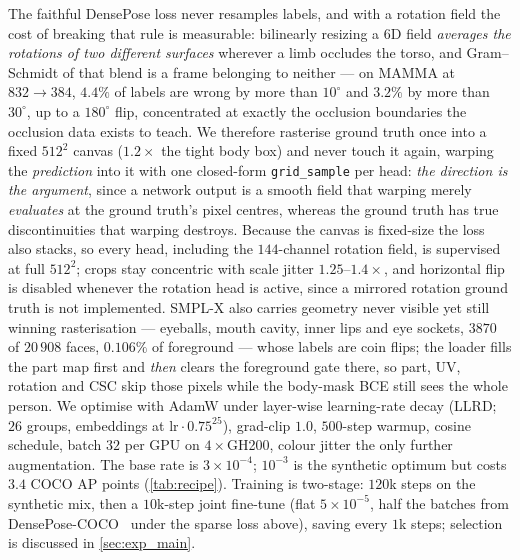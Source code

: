 The faithful DensePose loss never resamples labels, and with a rotation field the cost of breaking
that rule is measurable: bilinearly resizing a $6$D field \emph{averages the rotations of two
different surfaces} wherever a limb occludes the torso, and Gram--Schmidt of that blend is a frame
belonging to neither --- on MAMMA at $832\!\rightarrow\!384$, $4.4\%$ of labels are wrong by more
than $10^\circ$ and $3.2\%$ by more than $30^\circ$, up to a $180^\circ$ flip, concentrated at
exactly the occlusion boundaries the occlusion data exists to teach. We therefore rasterise ground
truth once into a fixed $512^2$ canvas ($1.2\times$ the tight body box) and never touch it again,
warping the \emph{prediction} into it with one closed-form \texttt{grid\_sample} per head:
\emph{the direction is the argument}, since a network output is a smooth field that warping merely
\emph{evaluates} at the ground truth's pixel centres, whereas the ground truth has true
discontinuities that warping destroys. Because the canvas is fixed-size the loss also stacks, so
every head, including the $144$-channel rotation field, is supervised at full $512^2$; crops stay
concentric with scale jitter $1.25$--$1.4\times$, and horizontal flip is disabled whenever the
rotation head is active, since a mirrored rotation ground truth is not implemented. SMPL-X also
carries geometry never visible yet still winning rasterisation --- eyeballs, mouth cavity, inner
lips and eye sockets, $3870$ of $20\,908$ faces, $0.106\%$ of foreground --- whose labels are coin
flips; the loader fills the part map first and \emph{then} clears the foreground gate there, so
part, UV, rotation and CSC skip those pixels while the body-mask BCE still sees the whole person.
We optimise with AdamW under layer-wise learning-rate decay (LLRD; $26$ groups, embeddings at
$\text{lr}\cdot0.75^{25}$), grad-clip $1.0$, $500$-step warmup, cosine schedule, batch $32$ per GPU
on $4{\times}$GH200, colour jitter the only further augmentation. The base rate is
$3{\times}10^{-4}$; $10^{-3}$ is the synthetic optimum but costs $3.4$ COCO AP points
(\cref{tab:recipe}). Training is two-stage: $120$k steps on the synthetic mix, then a $10$k-step
joint fine-tune (flat $5{\times}10^{-5}$, half the batches from
DensePose-COCO~\cite{guler2018densepose,lin2014coco} under the sparse loss above), saving every
$1$k steps; selection is discussed in \cref{sec:exp_main}.
